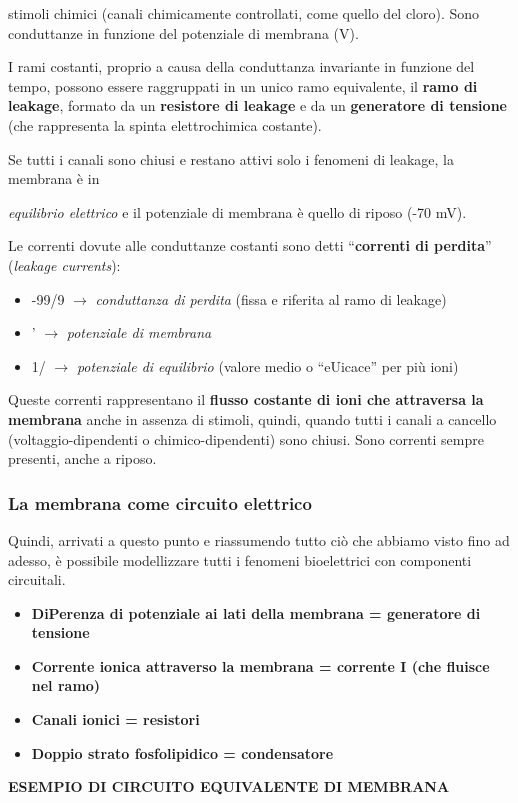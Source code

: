 \documentclass[12pt,a4paper,openany]{book}
\begin{document}
stimoli chimici (canali chimicamente controllati, come quello del cloro). Sono conduttanze in funzione del potenziale di membrana (V).

I rami costanti, proprio a causa della conduttanza invariante in funzione del tempo, possono essere raggruppati in un unico ramo equivalente, il \textbf{ramo di leakage}, formato da un \textbf{resistore di leakage }e da un \textbf{generatore di tensione }(che rappresenta la spinta elettrochimica costante).

Se tutti i canali sono chiusi e restano attivi solo i fenomeni di leakage, la membrana è in

\textit{equilibrio elettrico }e il potenziale di membrana è quello di riposo (-70 mV).

Le correnti dovute alle conduttanze costanti sono detti ``\textbf{correnti di perdita}'' (\textit{leakage currents}):


\begin{itemize}
  \item -99/9 $\rightarrow$ \textit{conduttanza di perdita }(fissa e riferita al ramo di leakage)
  \item ' $\rightarrow$ \textit{potenziale di membrana}
  \item 1/ $\rightarrow$ \textit{potenziale di equilibrio }(valore medio o ``eUicace'' per più ioni)
\end{itemize}
Queste correnti rappresentano il \textbf{flusso costante di ioni che attraversa la membrana }anche in assenza di stimoli, quindi, quando tutti i canali a cancello (voltaggio-dipendenti o chimico-dipendenti) sono chiusi. Sono correnti sempre presenti, anche a riposo.

\subsubsection{La membrana come circuito elettrico}

Quindi, arrivati a questo punto e riassumendo tutto ciò che abbiamo visto fino ad adesso, è possibile modellizzare tutti i fenomeni bioelettrici con componenti circuitali.

\begin{itemize}
  \item \textbf{DiPerenza di potenziale ai lati della membrana = generatore di tensione}
  \item \textbf{Corrente ionica attraverso la membrana = corrente I (che fluisce nel ramo)}
  \item \textbf{Canali ionici = resistori}
  \item \textbf{Doppio strato fosfolipidico = condensatore}
\end{itemize}
\textbf{ESEMPIO DI CIRCUITO EQUIVALENTE DI MEMBRANA}
\end{document}
